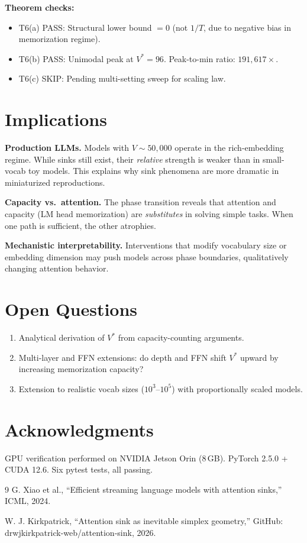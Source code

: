 \documentclass[11pt,a4paper]{amsart}
\theoremstyle{plain}
\theoremstyle{definition}
\begin{document}
\textbf{Theorem checks:}
\begin{itemize}
\item T6(a) PASS: Structural lower bound $=0$ (not $1/T$, due to
negative bias in memorization regime).
\item T6(b) PASS: Unimodal peak at $V^*=96$.
Peak-to-min ratio: $191{,}617\times$.
\item T6(c) SKIP: Pending multi-setting sweep for scaling law.
\end{itemize}

\section{Implications}

\textbf{Production LLMs.} Models with $V\sim 50{,}000$ operate in the
rich-embedding regime. While sinks still exist, their \emph{relative}
strength is weaker than in small-vocab toy models. This explains why
sink phenomena are more dramatic in miniaturized reproductions.

\textbf{Capacity vs.~attention.} The phase transition reveals that
attention and capacity (LM head memorization) are \emph{substitutes}
in solving simple tasks. When one path is sufficient, the other atrophies.

\textbf{Mechanistic interpretability.} Interventions that modify
vocabulary size or embedding dimension may push models across phase
boundaries, qualitatively changing attention behavior.

\section{Open Questions}

\begin{enumerate}
\item Analytical derivation of $V^*$ from capacity-counting arguments.
\item Multi-layer and FFN extensions: do depth and FFN shift $V^*$
upward by increasing memorization capacity?
\item Extension to realistic vocab sizes ($10^3$--$10^5$) with
proportionally scaled models.
\end{enumerate}

\section*{Acknowledgments}
GPU verification performed on NVIDIA Jetson Orin (8\,GB).
PyTorch 2.5.0 + CUDA 12.6. Six pytest tests, all passing.

\begin{thebibliography}{9}
G. Xiao et al., ``Efficient streaming language models with attention
sinks,'' ICML, 2024.

W. J. Kirkpatrick, ``Attention sink as inevitable simplex geometry,''
GitHub: drwjkirkpatrick-web/attention-sink, 2026.
\end{thebibliography}
\end{document}
